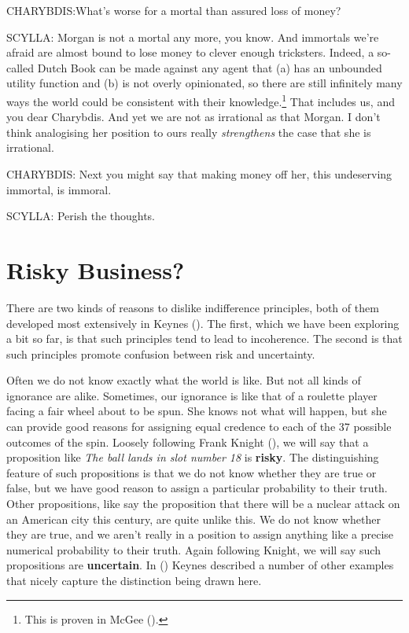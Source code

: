 \documentclass[
  10pt,
  letterpaper,
  DIV=11,
  numbers=noendperiod,
  twoside]{scrartcl}
\begin{document}
CHARYBDIS:What's worse for a mortal than assured loss of money?

SCYLLA: Morgan is not a mortal any more, you know. And immortals we're
afraid are almost bound to lose money to clever enough tricksters.
Indeed, a so-called Dutch Book can be made against any agent that (a)
has an unbounded utility function and (b) is not overly opinionated, so
there are still infinitely many ways the world could be consistent with
their knowledge.\footnote{This is proven in McGee
  ().} That includes us, and you dear
Charybdis. And yet we are not as irrational as that Morgan. I don't
think analogising her position to ours really \emph{strengthens} the
case that she is irrational.

CHARYBDIS: Next you might say that making money off her, this
undeserving immortal, is immoral.

SCYLLA: Perish the thoughts.

\section{Risky Business?}\label{risky-business}

There are two kinds of reasons to dislike indifference principles, both
of them developed most extensively in Keynes
(). The first, which we have been
exploring a bit so far, is that such principles tend to lead to
incoherence. The second is that such principles promote confusion
between risk and uncertainty.

Often we do not know exactly what the world is like. But not all kinds
of ignorance are alike. Sometimes, our ignorance is like that of a
roulette player facing a fair wheel about to be spun. She knows not what
will happen, but she can provide good reasons for assigning equal
credence to each of the 37 possible outcomes of the spin. Loosely
following Frank Knight (), we will say
that a proposition like \emph{The ball lands in slot number 18} is
\textbf{risky}. The distinguishing feature of such propositions is that
we do not know whether they are true or false, but we have good reason
to assign a particular probability to their truth. Other propositions,
like say the proposition that there will be a nuclear attack on an
American city this century, are quite unlike this. We do not know
whether they are true, and we aren't really in a position to assign
anything like a precise numerical probability to their truth. Again
following Knight, we will say such propositions are \textbf{uncertain}.
In () Keynes described a number of other
examples that nicely capture the distinction being drawn here.
\end{document}
